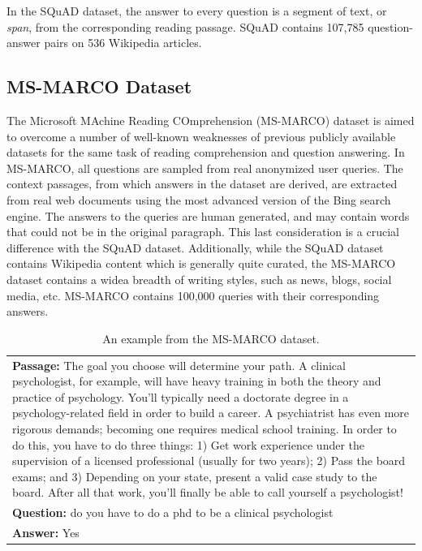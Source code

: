 \documentclass[11pt,a4paper]{article}
\begin{document}
In the SQuAD dataset, the answer to every question is a segment of text, or \textit{span}, from the corresponding reading passage. SQuAD contains
107,785 question-answer pairs on 536 Wikipedia articles.

\subsection{MS-MARCO Dataset}
\label{ssec:marco}

The Microsoft MAchine Reading COmprehension (MS-MARCO) \cite{msmarco:2016} dataset is aimed to overcome a number of well-known weaknesses of previous publicly available datasets for the same task of reading comprehension and question answering. In MS-MARCO, all questions are sampled from real anonymized user queries. The context passages, from which answers in the dataset are derived, are extracted from real web documents using the most advanced version of the Bing search engine. The answers to the queries are human generated, and may contain words that could not be in the original paragraph. This last consideration is a crucial difference with the SQuAD dataset. Additionally, while the SQuAD dataset contains Wikipedia content which is generally quite curated, the MS-MARCO dataset contains a widea breadth of writing styles, such as news, blogs, social media, etc. MS-MARCO contains 100,000 queries with their corresponding answers.


\begin{table}
\centering
\begin{tabular}{|p{7cm}|}
 \hline
\textbf{Passage:} The goal you choose will determine your path. A clinical psychologist, for example, will have heavy training in both the theory and practice of psychology. You’ll typically need a doctorate degree in a psychology-related field in order to build a career. A psychiatrist has even more rigorous demands; becoming one requires medical school training. In order to do this, you have to do three things: 1) Get work experience under the supervision of a licensed professional (usually for two years); 2) Pass the board exams; and 3) Depending on your state, present a valid case study to the board. After all that work, you’ll finally be able to call yourself a psychologist! \\ 
\textbf{Question:} do you have to do a phd to be a clinical psychologist\\
\textbf{Answer:} Yes\\
 \hline
\end{tabular}
\caption{An example from the MS-MARCO dataset.
  }
\end{table}
\end{document}
